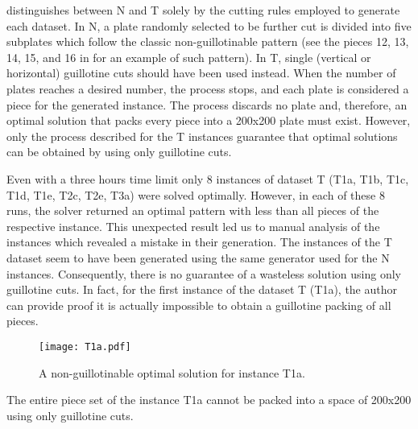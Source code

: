\citet{hopper_thesis} distinguishes between N and T solely by the cutting rules employed to generate each dataset.
In N, a plate randomly selected to be further cut is divided into five subplates which follow the classic non-guillotinable pattern (see the pieces 12, 13, 14, 15, and 16 in  for an example of such pattern).
In T, single (vertical or horizontal) guillotine cuts should have been used instead.
When the number of plates reaches a desired number, the process stops, and each plate is considered a piece for the generated instance.
The process discards no plate and, therefore, an optimal solution that packs every piece into a 200x200 plate must exist.
However, only the process described for the T instances guarantee that optimal solutions can be obtained by using only guillotine cuts.

\begin{comment}
Instances for which we proved infeasibility:
jl_yMhj5m T1a
jl_meyQRn T1b
jl_IJhWMm T1c
jl_aGVVYp T1d
jl_on4aRl T1e
jl_axD9ro T2c
jl_idk5Cm T2e
jl_61BNyp T3a
\end{comment}

Even with a three hours time limit only 8 instances of dataset T (T1a, T1b, T1c, T1d, T1e, T2c, T2e, T3a) were solved optimally.
However, in each of these 8 runs, the solver returned an optimal pattern with less than all pieces of the respective instance.
This unexpected result led us to manual analysis of the instances which revealed a mistake in their generation.
The instances of the T dataset seem to have been generated using the same generator used for the N instances.
Consequently, there is no guarantee of a wasteless solution using only guillotine cuts.
In fact, for the first instance of the dataset T (T1a), the author can provide proof it is actually impossible to obtain a guillotine packing of all pieces.

\begin{figure}[h]
  \caption{A non-guillotinable optimal solution for instance T1a.}
  \center
  \texttt{[image: T1a.pdf]}
  \label{fig:T1a}
\end{figure}

\begin{proposition}
The entire piece set of the instance T1a cannot be packed into a space of 200x200 using only guillotine cuts.
\end{proposition}

